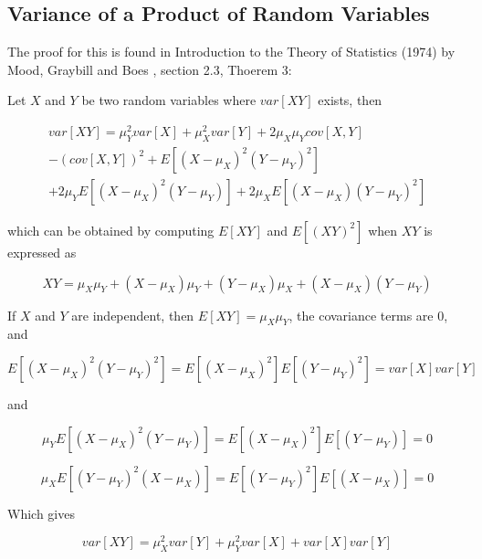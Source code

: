 \subsection{Variance of a Product of Random Variables}

The proof for this is found in Introduction to the Theory of Statistics (1974) by Mood, Graybill and Boes \cite{boes1974introduction}, section 2.3, Thoerem 3:

Let $X$ and $Y$ be two random variables where $var[XY]$ exists, then

\begin{equation}
\begin{split}
var[XY] = \mu_Y^2var[X] + \mu_X^2var[Y] + 2\mu_X\mu_Ycov[X,Y] 
\\
- (cov[X,Y])^2 + E[(X-\mu_X)^2(Y-\mu_Y)^2] 
\\
+ 2\mu_YE[(X-\mu_X)^2(Y-\mu_Y)] + 2\mu_XE[(X-\mu_X)(Y-\mu_Y)^2]
\end{split}
\end{equation}

which can be obtained by computing $E[XY]$ and $E[(XY)^2]$ when $XY$ is expressed as

\begin{equation}
XY = \mu_X\mu_Y + (X-\mu_X)\mu_Y + (Y-\mu_X)\mu_X + (X-\mu_X)(Y-\mu_Y)
\end{equation}

If $X$ and $Y$ are independent, then $E[XY] = \mu_X\mu_Y$, the covariance terms are 0, and

\begin{equation}
E[(X-\mu_X)^2(Y-\mu_Y)^2] = E[(X-\mu_X)^2]E[(Y-\mu_Y)^2] = var[X]var[Y]
\end{equation}

and

\begin{equation}
\mu_YE[(X-\mu_X)^2(Y-\mu_Y)] = E[(X-\mu_X)^2]E[(Y-\mu_Y)] = 0
\end{equation}

\begin{equation}
\mu_XE[(Y-\mu_Y)^2(X-\mu_X)] = E[(Y-\mu_Y)^2]E[(X-\mu_X)] = 0
\end{equation}

Which gives

\begin{equation}
var[XY] = \mu_X^2var[Y] + \mu_Y^2var[X] + var[X]var[Y]
\end{equation}

